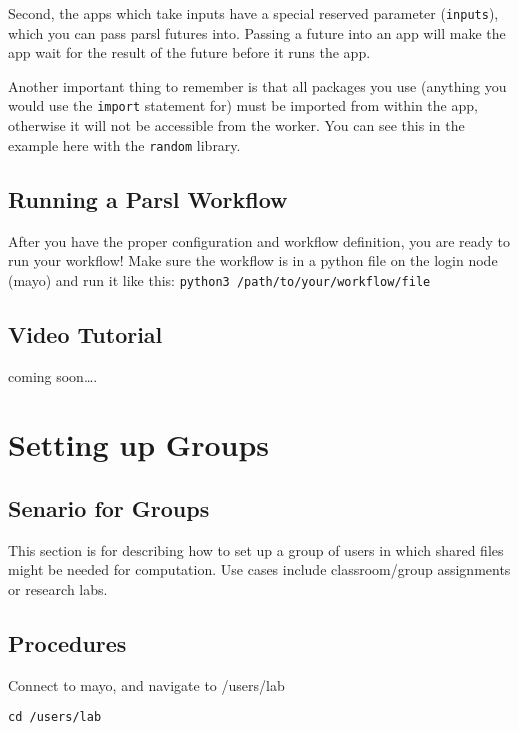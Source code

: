 \documentclass[]{book}
\theoremstyle{definition}
\theoremstyle{definition}
\theoremstyle{definition}
\theoremstyle{remark}
\begin{document}
Second, the apps which take inputs have a special reserved parameter
(\texttt{inputs}), which you can pass parsl futures into. Passing a
future into an app will make the app wait for the result of the future
before it runs the app.

Another important thing to remember is that all packages you use
(anything you would use the \texttt{import} statement for) must be
imported from within the app, otherwise it will not be accessible from
the worker. You can see this in the example here with the
\texttt{random} library.

\section{Running a Parsl Workflow}\label{running-a-parsl-workflow}

After you have the proper configuration and workflow definition, you are
ready to run your workflow! Make sure the workflow is in a python file
on the login node (mayo) and run it like this:
\texttt{python3\ /path/to/your/workflow/file}

\section{Video Tutorial}\label{video-tutorial}

coming soon\ldots{}.

\chapter{Setting up Groups}\label{setting-up-groups}

\section{Senario for Groups}\label{senario-for-groups}

This section is for describing how to set up a group of users in which
shared files might be needed for computation. Use cases include
classroom/group assignments or research labs.

\section{Procedures}\label{procedures}

Connect to mayo, and navigate to /users/lab

\begin{verbatim}
cd /users/lab
\end{verbatim}
\end{document}
